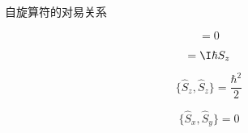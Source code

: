\begin{theorem}{自旋算符的对易关系}\label{ComOpQ_the8}

\begin{equation}
[\hat{S}_z, \hat{S}_z]=0
\end{equation}

\begin{equation}
[\hat{S}_x, \hat{S}_y]=\I\hbar S_z
\end{equation}

\begin{equation}
\{\hat{S}_z, \hat{S}_z\}=\frac{\hbar^2}{2}
\end{equation}

\begin{equation}
\{\hat{S}_x, \hat{S}_y\}=0
\end{equation}

\end{theorem}






